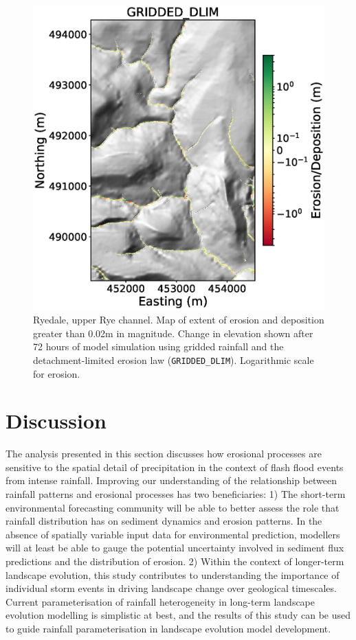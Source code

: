 \begin{figure}[htb]
\includegraphics[width=16cm]{chp06_figures_scripts/figure_ryedale_elev_diff_grid_dlim_UPPER.eps}
\caption{Ryedale, upper Rye channel. Map of extent of erosion and deposition greater than 0.02m in magnitude. Change in elevation shown after 72 hours of model simulation using gridded rainfall and the detachment-limited erosion law (\texttt{GRIDDED\_DLIM}). Logarithmic scale for erosion.}
\label{fig_ryedale_erodediff_UPPER_gridded_dlim}
\end{figure}

\section{Discussion}

The analysis presented in this section discusses how erosional processes are sensitive to the spatial detail of precipitation in the context of flash flood events from intense rainfall. Improving our understanding of the relationship between rainfall patterns and erosional processes has two beneficiaries: 1) The short-term environmental forecasting community will be able to better assess the role that  rainfall distribution has on sediment dynamics and erosion patterns. In the absence of spatially variable input data for environmental prediction, modellers will at least be able to gauge the potential uncertainty involved in sediment flux predictions and the distribution of erosion. 2) Within the context of longer-term landscape evolution, this study contributes to understanding the importance of individual storm events in driving landscape change over geological timescales. Current parameterisation of rainfall heterogeneity in long-term landscape evolution modelling is simplistic at best, and the results of this study can be used to guide rainfall parameterisation in landscape evolution model development. 

